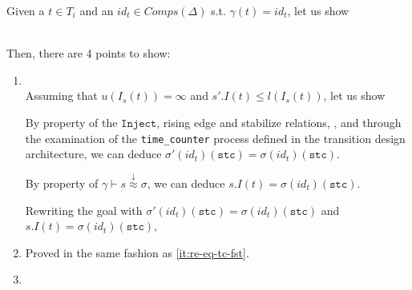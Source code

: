 \documentclass[dvipsnames,12pt]{article}
\begin{document}
\begin{niproof}
  Given a $t\in{}T_i$ and an $id_t\in{}Comps(\Delta)$ s.t. $\gamma(t)=id_t$, let us show\\
  \noindent{}\\

  \exT{}

  Then, there are 4 points to show:

  \begin{enumerate}
  \item\label{it:re-eq-tc-fst}
    \\
    
    Assuming that $u(I_s(t))=\infty$ and
    $s'.I(t)\le{}l(I_s(t))$, let us show\\

    By property of the $\mathtt{Inject}$, \hvhdl{} rising edge and
    stabilize relations, \InCsCompT, and through the examination of
    the \texttt{time_counter} process defined in the transition design
    architecture, we can deduce
    $\sigma'(id_t)(\texttt{stc})=\sigma(id_t)(\texttt{stc})$.

    By property of
    $\gamma\vdash{}s\stackrel{\downarrow}{\approx}\sigma$, we can
    deduce $s.I(t)=\sigma(id_t)(\texttt{stc})$.

    Rewriting the goal with $\sigma'(id_t)(\texttt{stc})=\sigma(id_t)(\texttt{stc})$
    and $s.I(t)=\sigma(id_t)(\texttt{stc})$, 
    
  \item

    \noindent{}Proved in the same fashion as \ref{it:re-eq-tc-fst}.
  \item


\end{enumerate}
\end{niproof}
\end{document}
